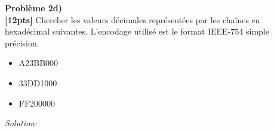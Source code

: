 \documentclass{article}
\newenvironment{problem}[2][Problème]
    { \begin{mdframed}[backgroundcolor=gray!20] \textbf{#1 #2} \\}
    {  \end{mdframed}}
\newenvironment{solution}
    {\textit{Solution:}}
    {}
\begin{document}
\begin{problem}{2d)}
\textbf{[12pts]} Chercher les valeurs décimales représentées par les chaînes en hexadécimal
suivantes. L’encodage utilisé est le format IEEE-754 simple précision.
\begin{itemize}
    \item A23BB000
    \item 33DD1000
    \item FF200000
\end{itemize}
\end{problem}

\begin{solution}
\end{solution}
\end{document}
